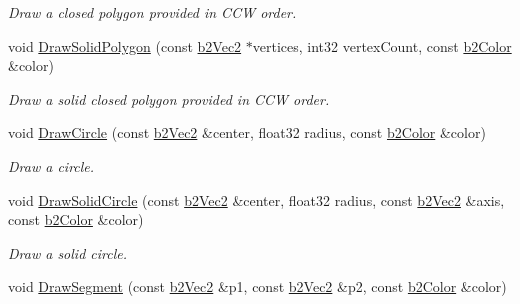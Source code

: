\begin{DoxyCompactItemize}
\begin{DoxyCompactList}\small\item\em Draw a closed polygon provided in C\-C\-W order. \end{DoxyCompactList}\item 
\hypertarget{class_g_l_e_s_debug_draw_aa68490f03cf0cb567ce6ccd78b18c5c3}{void \hyperlink{class_g_l_e_s_debug_draw_aa68490f03cf0cb567ce6ccd78b18c5c3}{Draw\-Solid\-Polygon} (const \hyperlink{structb2_vec2}{b2\-Vec2} $\ast$vertices, int32 vertex\-Count, const \hyperlink{structb2_color}{b2\-Color} \&color)}\label{class_g_l_e_s_debug_draw_aa68490f03cf0cb567ce6ccd78b18c5c3}

\begin{DoxyCompactList}\small\item\em Draw a solid closed polygon provided in C\-C\-W order. \end{DoxyCompactList}\item 
\hypertarget{class_g_l_e_s_debug_draw_a9beacb1f221106e10ea68614ff336bf8}{void \hyperlink{class_g_l_e_s_debug_draw_a9beacb1f221106e10ea68614ff336bf8}{Draw\-Circle} (const \hyperlink{structb2_vec2}{b2\-Vec2} \&center, float32 radius, const \hyperlink{structb2_color}{b2\-Color} \&color)}\label{class_g_l_e_s_debug_draw_a9beacb1f221106e10ea68614ff336bf8}

\begin{DoxyCompactList}\small\item\em Draw a circle. \end{DoxyCompactList}\item 
\hypertarget{class_g_l_e_s_debug_draw_ac06ea317fe6075cb9e1ff87ff89b8007}{void \hyperlink{class_g_l_e_s_debug_draw_ac06ea317fe6075cb9e1ff87ff89b8007}{Draw\-Solid\-Circle} (const \hyperlink{structb2_vec2}{b2\-Vec2} \&center, float32 radius, const \hyperlink{structb2_vec2}{b2\-Vec2} \&axis, const \hyperlink{structb2_color}{b2\-Color} \&color)}\label{class_g_l_e_s_debug_draw_ac06ea317fe6075cb9e1ff87ff89b8007}

\begin{DoxyCompactList}\small\item\em Draw a solid circle. \end{DoxyCompactList}\item 
\hypertarget{class_g_l_e_s_debug_draw_a2a24d1fe4eb99b6382380c234ab77382}{void \hyperlink{class_g_l_e_s_debug_draw_a2a24d1fe4eb99b6382380c234ab77382}{Draw\-Segment} (const \hyperlink{structb2_vec2}{b2\-Vec2} \&p1, const \hyperlink{structb2_vec2}{b2\-Vec2} \&p2, const \hyperlink{structb2_color}{b2\-Color} \&color)}\label{class_g_l_e_s_debug_draw_a2a24d1fe4eb99b6382380c234ab77382}


\end{DoxyCompactItemize}

